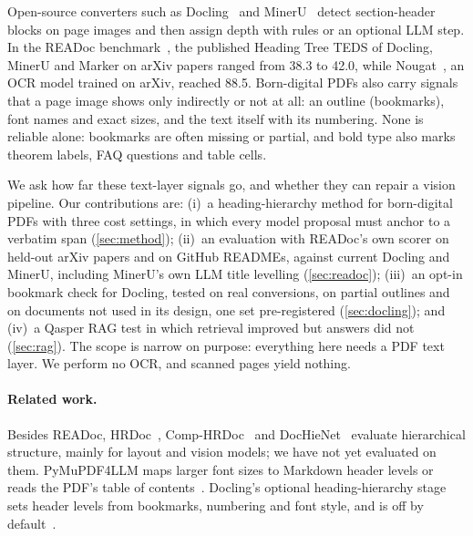 \documentclass[10pt,twocolumn,letterpaper]{article}
\begin{document}
Open-source converters such as Docling~\cite{auer2024docling,docling_software} and
MinerU~\cite{wang2024mineru,mineru_software} detect section-header blocks on page images and then
assign depth with rules or an optional LLM step. In the READoc benchmark~\cite{li2025readoc}, the
published Heading Tree TEDS of Docling, MinerU and Marker on arXiv papers ranged from 38.3 to 42.0,
while Nougat~\cite{blecher2024nougat}, an OCR model trained on arXiv, reached 88.5. Born-digital PDFs
also carry signals that a page image shows only indirectly or not at all: an outline (bookmarks),
font names and exact sizes, and the text itself with its numbering. None is reliable alone: bookmarks
are often missing or partial, and bold type also marks theorem labels, FAQ questions and table cells.

We ask how far these text-layer signals go, and whether they can repair a vision pipeline.
Our contributions are:
(i)~a heading-hierarchy method for born-digital PDFs with three cost settings, in which every
model proposal must anchor to a verbatim span (\cref{sec:method});
(ii)~an evaluation with READoc's own scorer on held-out arXiv papers and on GitHub READMEs, against
current Docling and MinerU, including MinerU's own LLM title levelling (\cref{sec:readoc});
(iii)~an opt-in bookmark check for Docling, tested on real conversions, on partial outlines and on
documents not used in its design, one set pre-registered (\cref{sec:docling}); and
(iv)~a Qasper RAG test in which retrieval improved but answers did not (\cref{sec:rag}).
The scope is narrow on purpose: everything here needs a PDF text layer. We perform no OCR, and
scanned pages yield nothing.

\paragraph{Related work.} Besides READoc, HRDoc~\cite{ma2023hrdoc}, Comp-HRDoc~\cite{wang2024detectorderconstruct}
and DocHieNet~\cite{xing2024dochienet} evaluate hierarchical structure, mainly for layout and vision
models; we have not yet evaluated on them. PyMuPDF4LLM maps larger font sizes to Markdown header
levels or reads the PDF's table of contents~\cite{pymupdf4llm_software}. Docling's optional
heading-hierarchy stage sets header levels from bookmarks, numbering and font style, and is off by
default~\cite{docling_software}.
\end{document}
